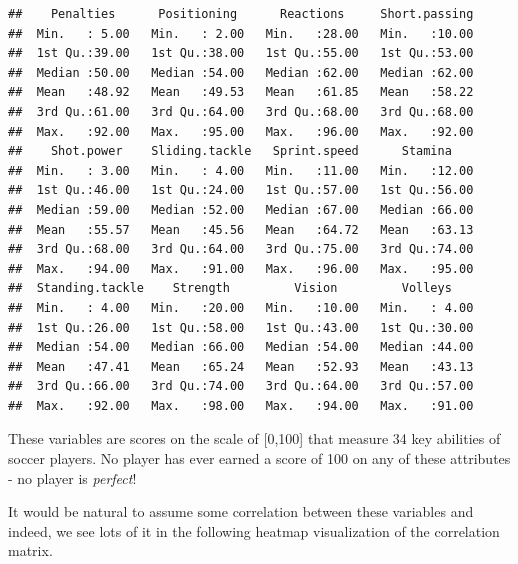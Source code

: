 \documentclass[
]{article}
\theoremstyle{definition}
\theoremstyle{definition}
\theoremstyle{definition}
\theoremstyle{definition}
\theoremstyle{remark}
\begin{document}
\begin{verbatim}
##    Penalties      Positioning      Reactions     Short.passing  
##  Min.   : 5.00   Min.   : 2.00   Min.   :28.00   Min.   :10.00  
##  1st Qu.:39.00   1st Qu.:38.00   1st Qu.:55.00   1st Qu.:53.00  
##  Median :50.00   Median :54.00   Median :62.00   Median :62.00  
##  Mean   :48.92   Mean   :49.53   Mean   :61.85   Mean   :58.22  
##  3rd Qu.:61.00   3rd Qu.:64.00   3rd Qu.:68.00   3rd Qu.:68.00  
##  Max.   :92.00   Max.   :95.00   Max.   :96.00   Max.   :92.00  
##    Shot.power    Sliding.tackle   Sprint.speed      Stamina     
##  Min.   : 3.00   Min.   : 4.00   Min.   :11.00   Min.   :12.00  
##  1st Qu.:46.00   1st Qu.:24.00   1st Qu.:57.00   1st Qu.:56.00  
##  Median :59.00   Median :52.00   Median :67.00   Median :66.00  
##  Mean   :55.57   Mean   :45.56   Mean   :64.72   Mean   :63.13  
##  3rd Qu.:68.00   3rd Qu.:64.00   3rd Qu.:75.00   3rd Qu.:74.00  
##  Max.   :94.00   Max.   :91.00   Max.   :96.00   Max.   :95.00  
##  Standing.tackle    Strength         Vision         Volleys     
##  Min.   : 4.00   Min.   :20.00   Min.   :10.00   Min.   : 4.00  
##  1st Qu.:26.00   1st Qu.:58.00   1st Qu.:43.00   1st Qu.:30.00  
##  Median :54.00   Median :66.00   Median :54.00   Median :44.00  
##  Mean   :47.41   Mean   :65.24   Mean   :52.93   Mean   :43.13  
##  3rd Qu.:66.00   3rd Qu.:74.00   3rd Qu.:64.00   3rd Qu.:57.00  
##  Max.   :92.00   Max.   :98.00   Max.   :94.00   Max.   :91.00
\end{verbatim}

These variables are scores on the scale of {[}0,100{]} that measure 34 key abilities of soccer players. No player has ever earned a score of 100 on any of these attributes - no player is \emph{perfect}!

It would be natural to assume some correlation between these variables and indeed, we see lots of it in the following heatmap visualization of the correlation matrix.
\end{document}
